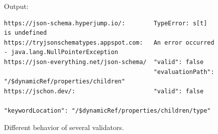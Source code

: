 \begin{toappendix}
\begin{figure}[hb]
Output:
\begin{querybox}{}
\begin{lstlisting}[style=query,escapechar=Z]
https://json-schema.hyperjump.io/:        TypeError: s[t] is undefined
https://tryjsonschematypes.appspot.com:   An error occurred - java.lang.NullPointerException
https://json-everything.net/json-schema/  "valid": false       
                                          "evaluationPath": "/$dynamicRef/properties/children"
https://jschon.dev/:                      "valid": false
                                          "keywordLocation": "/$dynamicRef/properties/children/type"
\end{lstlisting}
\end{querybox}
\caption{Different behavior of several {\JS} validators.}
\label{fig:dynref}
\end{figure}

\end{toappendix}

\newpage

